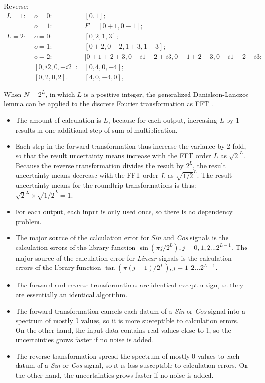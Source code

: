 \documentclass[twoside]{article}
\numberwithin{equation}{section}
\begin{document}
Reverse:
\begin{align*}
L = 1:\;& o=0: & [0, 1]; \\
 & o = 1: & F = [0 + 1, 0 - 1]; \\
L = 2:\;& o=0: & [0, 2, 1, 3]; \\
 & o = 1: & [0 + 2, 0 - 2, 1 + 3, 1 - 3]; \\
 & o = 2: & [0 + 1 + 2 + 3, 0 - i 1 - 2 + i 3 , 0 - 1 + 2 - 3, 0 + i 1 - 2 - i 3; \\
 & [0, i 2, 0, - i 2]:& [0, 4, 0, -4]; \\
 & [0, 2, 0, 2]:& [4, 0, -4, 0];
\end{align*}

\fi

When $N = 2^{L}$, in which $L$ is a positive integer, the generalized Danielson-Lanczos lemma \cite{Numerical_Recipes} can be applied to the discrete Fourier transformation as FFT \cite{Numerical_Recipes}. 
\begin{itemize}
\item The amount of calculation is $L$, because for each output, increasing $L$ by 1 results in one additional step of sum of multiplication.

\item Each step in the forward transformation thus increase the variance by $2$-fold, so that the result uncertainty means increase with the FFT order $L$ as $\sqrt{2}^L$.
Because the reverse transformation divides the result by $2^L$, the result uncertainty means decrease with the FFT order $L$ as $\sqrt{1/2}^L$.
The result uncertainty means for the roundtrip transformations is thus: $\sqrt{2}^L \times \sqrt{1/2}^L = 1$.

\item For each output, each input is only used once, so there is no dependency problem.

\item The major source of the calculation error for \emph{Sin} and \emph{Cos} signals is the calculation errors of the library function $\sin(\pi j /2^L), j = 0, 1, 2 ... 2^{L-1}$.
The major source of the calculation error for \emph{Linear} signals is the calculation errors of the library function $\tan(\pi (j - 1) /2^L), j = 1, 2 ... 2^{L-1}$.

\item The forward and reverse transformations are identical except a sign, so they are essentially an identical algorithm.  

\item The forward transformation cancels each datum of a \emph{Sin} or \emph{Cos} signal into a spectrum of mostly $0$ values, so it is more susceptible to calculation errors.
On the other hand, the input data contains real values close to 1, so the uncertainties grows faster if no noise is added.

\item The reverse transformation spread the spectrum of mostly $0$ values to each datum of a \emph{Sin} or \emph{Cos} signal, so it is less susceptible to calculation errors.
On the other hand, the uncertainties grows faster if no noise is added.

\end{itemize}
\end{document}
